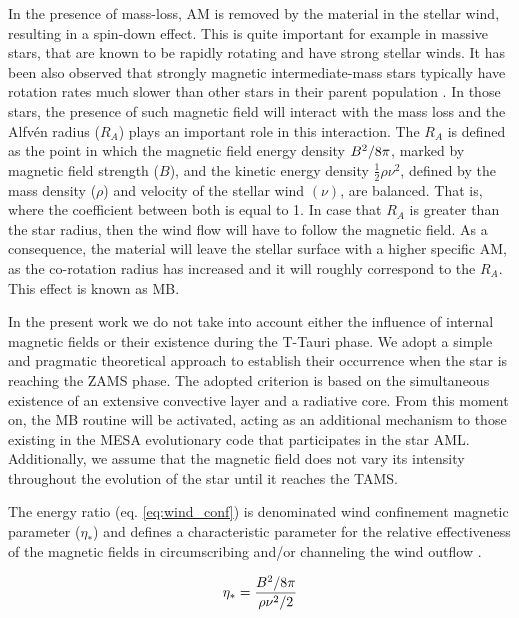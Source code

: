 \documentclass[fleqn,usenatbib]{mnras}
\begin{document}
In the presence of mass-loss, AM is removed by the material in the stellar wind, resulting in a spin-down effect. This is quite important for example in massive stars, that are known to be rapidly rotating and have strong stellar winds. It has been also observed that strongly magnetic intermediate-mass stars typically have rotation rates much slower than other stars in their parent population \citep{Mathys2006}. In those stars, the presence of such magnetic field will interact with the mass loss and the Alfv\'{e}n radius ($R_{A}$) plays an important role in this interaction. The $R_{A}$ is defined as the point in which the magnetic field energy density $B^{2}/8\pi$, marked by magnetic field strength ($B$), and the kinetic energy density $\frac{1}{2}\rho\nu^{2}$, defined by the mass density ($\rho$) and velocity of the stellar wind $(\nu)$, are balanced. That is, where the coefficient between both is equal to 1. In case that $R_{A}$ is greater than the star radius, then the wind flow will have to follow the magnetic field. As a consequence, the material will leave the stellar surface with a higher specific AM, as the co-rotation radius has increased and it will roughly correspond to the $R_{A}$. This effect is known as MB.\par

In the present work we do not take into account either the influence of internal magnetic fields or their existence during the T-Tauri phase. We adopt a simple and pragmatic theoretical approach to establish their occurrence when the star is reaching the ZAMS phase. The adopted criterion is based on the simultaneous existence of an extensive convective layer and a radiative core. From this moment on, the MB routine will be activated, acting as an additional mechanism to those existing in the MESA evolutionary code that participates in the star AML. Additionally, we assume that the magnetic field does not vary its intensity throughout the evolution of the star until it reaches the TAMS.\par

The energy ratio (eq. \ref{eq:wind_conf}) is denominated wind confinement magnetic parameter ($\eta_*$) and defines a characteristic parameter for the relative effectiveness of the magnetic fields in circumscribing and/or channeling the wind outflow \citep{UdDoula2002}.\par

\begin{ceqn}
\begin{equation}
    \eta_* = \frac{B^{2}/8\pi}{\rho\nu^2/2} \label{eq:wind_conf}
\end{equation}
\end{ceqn}
\end{document}
